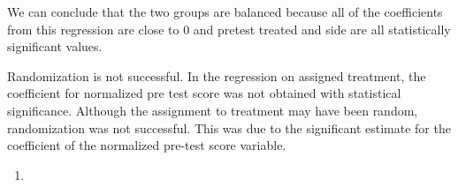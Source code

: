 \documentclass[
  12pt,
  landscape]{article}
\begin{document}
We can conclude that the two groups are balanced because all of the
coefficients from this regression are close to 0 and pretest treated and
side are all statistically significant values.

Randomization is not successful. In the regression on assigned
treatment, the coefficient for normalized pre test score was not
obtained with statistical significance. Although the assignment to
treatment may have been random, randomization was not successful. This
was due to the significant estimate for the coefficient of the
normalized pre-test score variable.

\begin{enumerate}
\def\labelenumi{(\alph{enumi})}
\setcounter{enumi}{19}
\item
\end{enumerate}
\end{document}
